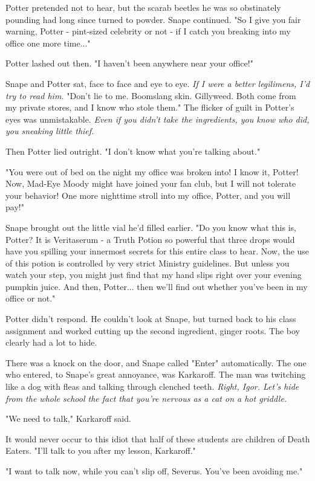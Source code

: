 \documentclass[a4paper,11pt]{article}
\begin{document}
Potter pretended not to hear, but the scarab beetles he was so obstinately pounding had long since turned to powder. Snape continued. "So I give you fair warning, Potter - pint-sized celebrity or not - if I catch you breaking into my office one more time..."

Potter lashed out then. "I haven't been anywhere near your office!"

Snape and Potter sat, face to face and eye to eye. \emph{If I were a better legilimens, I'd try to read him.} "Don't lie to me. Boomslang skin. Gillyweed. Both come from my private stores, and I know who stole them." The flicker of guilt in Potter's eyes was unmistakable. \emph{Even if you didn't take the ingredients, you know who did, you sneaking little thief.}

Then Potter lied outright. "I don't know what you're talking about."

"You were out of bed on the night my office was broken into! I know it, Potter! Now, Mad-Eye Moody might have joined your fan club, but I will not tolerate your behavior! One more nighttime stroll into my office, Potter, and you will pay!"

Snape brought out the little vial he'd filled earlier. "Do you know what this is, Potter? It is Veritaserum - a Truth Potion so powerful that three drops would have you spilling your innermost secrets for this entire class to hear. Now, the use of this potion is controlled by very strict Ministry guidelines. But unless you watch your step, you might just find that my hand slips right over your evening pumpkin juice. And then, Potter... then we'll find out whether you've been in my office or not."

Potter didn't respond. He couldn't look at Snape, but turned back to his class assignment and worked cutting up the second ingredient, ginger roots. The boy clearly had a lot to hide.

There was a knock on the door, and Snape called "Enter" automatically. The one who entered, to Snape's great annoyance, was Karkaroff. The man was twitching like a dog with fleas and talking through clenched teeth. \emph{Right, Igor. Let's hide from the whole school the fact that you're nervous as a cat on a hot griddle.}

"We need to talk," Karkaroff said.

It would never occur to this idiot that half of these students are children of Death Eaters. "I'll talk to you after my lesson, Karkaroff."

"I want to talk now, while you can't slip off, Severus. You've been avoiding me."
\end{document}
